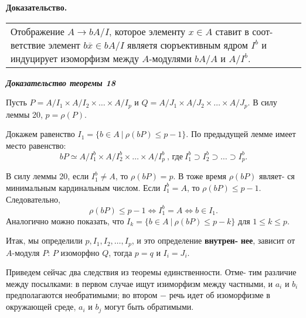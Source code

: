 \documentclass{mai_book}
\begin{document}
	\noindent
	{\bf Доказательство.}
	
	\begin{tabular}{|p{12.5cm}}
	\noindent
	Отображение $A \longrightarrow bA/I$, которое элементу $x \in A$ ставит в соот-\linebreak
	ветствие элемент $b\overline{x} \in bA/I$ являетя сюръективным ядром $I^{b}$ и
	индуцирует изоморфизм между $A$-модулями $bA/A$ и $A/I^{b}.$
	\end{tabular}
	
	\noindent
	{\it {\bf Доказательство теоремы 18}}
	
	Пусть $P = A/I_{1} \times A/I_{2} \times \ldots \times A/I_{p}$ и $Q = A/J_{1} \times A/J_{2} \times \ldots \times A/J_{p}.$\linebreak
	В силу леммы 20, $p = \rho (P)$.
	
	Докажем равенство $I_{1} = \{ b \in A \ | \ \rho (bP) \leqslant p - 1\} .$ По предыдущей\linebreak
	лемме имеет место равенство:
	$$bP \simeq A/I^{b}_{1} \times A/I^{b}_{2} \times \ldots \times A/I^{b}_{p} \ \text{, где} \ I^{b}_{1} \supset I^{b}_{2} \supset \ldots \supset I^{b}_{p}. $$
	
	\pagebreak

	
	\noindent
	В силу леммы 20, если $I^{b}_{1} \neq A$, то $\rho (bP) = p$. В тоже время $\rho (bP)$ являет-\linebreak
	ся минимальным кардинальным числом. Если $I^{b}_{1} = A$, то $\rho (bP) \leqslant p - 1$.\linebreak
	Следовательно,
	$$\rho (bP) \leqslant p - 1 \Longleftrightarrow I^{b}_{1} = A \Longleftrightarrow b \in I_{1}.$$
	Аналогично можно показать, что $I_{k} = \{b \in A \ | \ \rho (bP) \leqslant p - k \}$ для\linebreak
	$1 \leqslant k \leqslant p$.
	
	Итак, мы определили $p, I_{1}, I_{2}, \ldots, I_{p}$, и это определение {\bf внутрен-}\linebreak
	{\bf нее}, зависит от $A$-модуля $P$: $P$ изоморфно $Q$, тогда $p = q$ и $I_{i} = J_{i}$.
	
	Приведем сейчас два следствия из теоремы единственности. Отме-\linebreak
	тим различие между посылками: в первом случае ищут изиморфизм\linebreak
	между частными, и $a_{i}$ и $b_{i}$ предполагаются необратимыми; во втором\linebreak
	$-$ речь идет об изоморфизме в окружающей среде, $a_{i}$ и $b_{j}$ могут быть\linebreak
	обратимыми.
	
\end{document}
